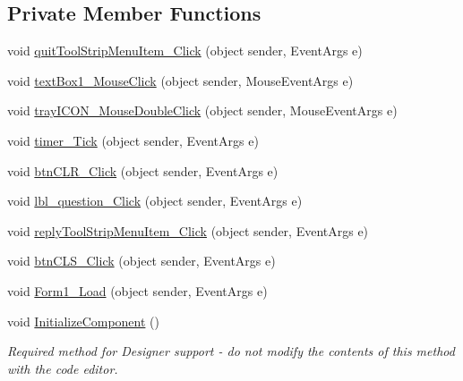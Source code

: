 \subsection*{\-Private \-Member \-Functions}
\begin{DoxyCompactItemize}
\item 
void \hyperlink{class_sr_p___classroom_inq_1_1_form1_a50ee07ffedeeb11723783a22b68d771e}{quit\-Tool\-Strip\-Menu\-Item\-\_\-\-Click} (object sender, \-Event\-Args e)
\item 
void \hyperlink{class_sr_p___classroom_inq_1_1_form1_abad333b9cb93e348985e1bbf8bdf3ac8}{text\-Box1\-\_\-\-Mouse\-Click} (object sender, \-Mouse\-Event\-Args e)
\item 
void \hyperlink{class_sr_p___classroom_inq_1_1_form1_aa08d376ed55a0c420b54f148ffc27fa6}{tray\-I\-C\-O\-N\-\_\-\-Mouse\-Double\-Click} (object sender, \-Mouse\-Event\-Args e)
\item 
void \hyperlink{class_sr_p___classroom_inq_1_1_form1_a934512bc74ea7082891c2c9e6b7218bd}{timer\-\_\-\-Tick} (object sender, \-Event\-Args e)
\item 
void \hyperlink{class_sr_p___classroom_inq_1_1_form1_a68e1ca22ba27595b9d58d4e3cb75d90f}{btn\-C\-L\-R\-\_\-\-Click} (object sender, \-Event\-Args e)
\item 
void \hyperlink{class_sr_p___classroom_inq_1_1_form1_afd5ddd57b7f50a3bd3ef81e7232544e7}{lbl\-\_\-question\-\_\-\-Click} (object sender, \-Event\-Args e)
\item 
void \hyperlink{class_sr_p___classroom_inq_1_1_form1_abb098e1cf46c80330328f5efacf0d13b}{reply\-Tool\-Strip\-Menu\-Item\-\_\-\-Click} (object sender, \-Event\-Args e)
\item 
void \hyperlink{class_sr_p___classroom_inq_1_1_form1_addaab901a9168e5c6495c7234bb826f5}{btn\-C\-L\-S\-\_\-\-Click} (object sender, \-Event\-Args e)
\item 
void \hyperlink{class_sr_p___classroom_inq_1_1_form1_a3cf1d759aec7be828a7d014c0dc18124}{\-Form1\-\_\-\-Load} (object sender, \-Event\-Args e)
\item 
void \hyperlink{class_sr_p___classroom_inq_1_1_form1_afca6d3960957efcb788ae1396c716dfd}{\-Initialize\-Component} ()
\begin{DoxyCompactList}\small\item\em \-Required method for \-Designer support -\/ do not modify the contents of this method with the code editor. \end{DoxyCompactList}\end{DoxyCompactItemize}
